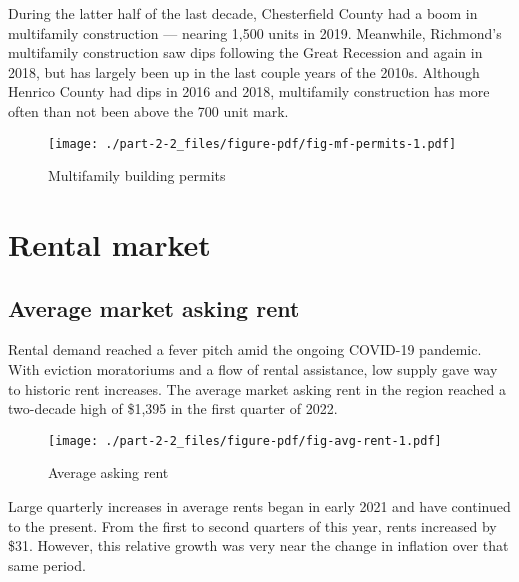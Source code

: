 \documentclass[
  letterpaper,
  DIV=11,
  numbers=noendperiod]{scrreprt}
\begin{document}
During the latter half of the last decade, Chesterfield County had a
boom in multifamily construction --- nearing 1,500 units in 2019.
Meanwhile, Richmond's multifamily construction saw dips following the
Great Recession and again in 2018, but has largely been up in the last
couple years of the 2010s. Although Henrico County had dips in 2016 and
2018, multifamily construction has more often than not been above the
700 unit mark.

\begin{figure}

{\centering \texttt{[image: ./part-2-2\_files/figure-pdf/fig-mf-permits-1.pdf]}

}

\caption{\label{fig-mf-permits}Multifamily building permits}

\end{figure}

\hypertarget{rental-market}{%
\section{Rental market}\label{rental-market}}

\hypertarget{average-market-asking-rent}{%
\subsection{Average market asking
rent}\label{average-market-asking-rent}}

Rental demand reached a fever pitch amid the ongoing COVID-19 pandemic.
With eviction moratoriums and a flow of rental assistance, low supply
gave way to historic rent increases. The average market asking rent in
the region reached a two-decade high of \$1,395 in the first quarter of
2022.

\begin{figure}

{\centering \texttt{[image: ./part-2-2\_files/figure-pdf/fig-avg-rent-1.pdf]}

}

\caption{\label{fig-avg-rent}Average asking rent}

\end{figure}

Large quarterly increases in average rents began in early 2021 and have
continued to the present. From the first to second quarters of this
year, rents increased by \$31. However, this relative growth was very
near the change in inflation over that same period.
\end{document}
